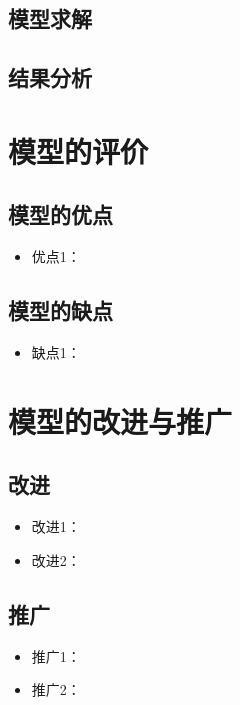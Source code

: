 \documentclass[withoutpreface,bwprint]{cumcmthesis}
\begin{document}
\subsection{模型求解}

\subsection{结果分析}










\section{模型的评价}

\subsection{模型的优点}
\begin{itemize}[itemindent=2em]
\item 优点1：
\end{itemize}

\subsection{模型的缺点}
\begin{itemize}[itemindent=2em]
\item 缺点1：
\end{itemize}

\section{模型的改进与推广}

\subsection{改进}
\begin{itemize}[itemindent=2em]
   \item 改进1：
   \item 改进2：
\end{itemize}


\subsection{推广}
\begin{itemize}[itemindent=2em]
    \item 推广1：
   \item 推广2：
\end{itemize}
\newpage
\nocite{*}
\end{document}
